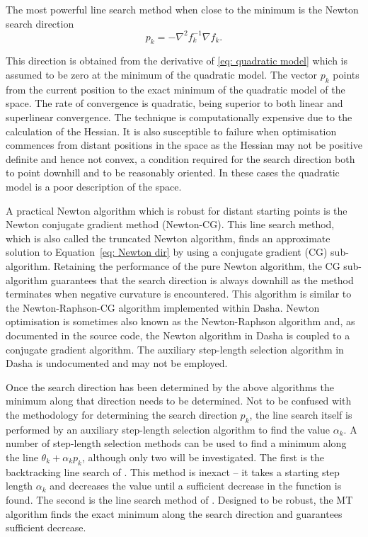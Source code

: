 \begin{htmlonly}
\begin{htmlonly}
The most powerful line search method when close to the minimum is the Newton search direction
\begin{equation} \label{eq: Newton dir}
 p_k = - \nabla^2 f_k^{-1} \nabla f_k.
\end{equation}

\noindent This direction is obtained from the derivative of \eqref{eq: quadratic model} which is assumed to be zero at the minimum of the quadratic model.  The vector $p_k$ points from the current position to the exact minimum of the quadratic model of the space.  The rate of convergence is quadratic, being superior to both linear and superlinear convergence.  The technique is computationally expensive due to the calculation of the Hessian.  It is also susceptible to failure when optimisation commences from distant positions in the space as the Hessian may not be positive definite and hence not convex, a condition required for the search direction both to point downhill and to be reasonably oriented.  In these cases the quadratic model is a poor description of the space.

A practical Newton algorithm which is robust for distant starting points is the Newton conjugate gradient method (Newton-CG).  This line search method, which is also called the truncated Newton algorithm, finds an approximate solution to Equation~\eqref{eq: Newton dir} by using a conjugate gradient (CG) sub-algorithm.  Retaining the performance of the pure Newton algorithm, the CG sub-algorithm guarantees that the search direction is always downhill as the method terminates when negative curvature is encountered.  This algorithm is similar to the Newton-Raphson-CG algorithm implemented within Dasha.  Newton optimisation is sometimes also known as the Newton-Raphson algorithm and, as documented in the source code, the Newton algorithm in Dasha is coupled to a conjugate gradient algorithm.  The auxiliary ste\mbox{p-l}ength selection algorithm in Dasha is undocumented and may not be employed.

Once the search direction has been determined by the above algorithms the minimum along that direction needs to be determined.  Not to be confused with the methodology for determining the search direction $p_k$, the line search itself is performed by an auxiliary step-length selection algorithm to find the value $\alpha_k$.  A number of step-length selection methods can be used to find a minimum along the line $\theta_k + \alpha_k p_k$, although only two will be investigated.  The first is the backtracking line search of \citet{NocedalWright99}.  This method is inexact -- it takes a starting step length $\alpha_k$ and decreases the value until a sufficient decrease in the function is found.  The second is the line search method of \citet{MoreThuente94}.  Designed to be robust, the MT algorithm finds the exact minimum along the search direction and guarantees sufficient decrease.




\end{htmlonly}
\end{htmlonly}
